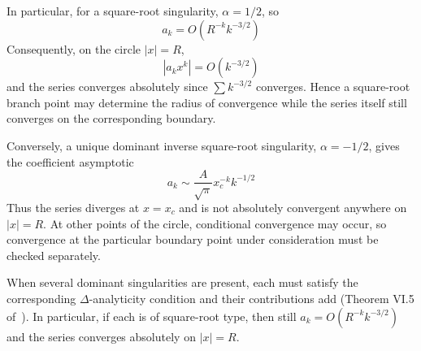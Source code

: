 \documentclass[a4paper]{amsart}
\begin{document}
In particular, for a square-root singularity, $\alpha=1/2$, so
\begin{equation*}
a_k=O\left(R^{-k}k^{-3/2}\right)
\end{equation*}
Consequently, on the circle $|x|=R$,
\begin{equation*}
|a_kx^k|=O(k^{-3/2})
\end{equation*}
and the series converges absolutely since $\sum k^{-3/2}$ converges. Hence a square-root branch point may determine the radius of convergence while the series itself still converges on the corresponding boundary.

Conversely, a unique dominant inverse square-root singularity, $\alpha=-1/2$, gives the coefficient asymptotic
\begin{equation*}
a_k\sim\frac{A}{\sqrt{\pi}}x_c^{-k}k^{-1/2}
\end{equation*}
Thus the series diverges at $x=x_c$ and is not absolutely convergent anywhere on $|x|=R$. At other points of the circle, conditional convergence may occur, so convergence at the particular boundary point under consideration must be checked separately.

When several dominant singularities are present, each must satisfy the corresponding $\Delta$-analyticity condition and their contributions add (Theorem VI.5 of~\cite{Flajolet2009}). In particular, if each is of square-root type, then still $a_k=O(R^{-k}k^{-3/2})$ and the series converges absolutely on $|x|=R$. %
\end{document}
